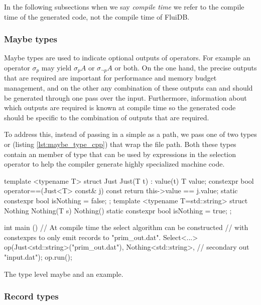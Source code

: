 In the following subsections when we say \emph{compile time} we refer to
the compile time of the generated code, not the compile time of FluiDB.

\subsubsection{Maybe types}

Maybe types are used to indicate optional outputs of operators. For
example an operator \(\sigma_p\) may yield \(\sigma_p A\) or
\(\sigma_{\neg p} A\) or both. On the one hand, the precise outputs that
are required are important for performance and memory budget
management, and on the other any combination of these outputs can and
should be generated through one pass over the input. Furthermore,
information about which outputs are required is known at compile time
so the generated code should be specific to the combination of outputs
that are required.

To address this, instead of passing in a simple  as a
path, we pass one of two types  or  (listing
\ref{lst:maybe_type_cpp}) that wrap the file path. Both these types
contain an  member of  type that can be used by
 expressions in the selection operator to help
the compiler generate highly specialized machine code.

\begin{code}
\begin{cppcode}
template <typename T>
struct Just {
  Just(T t) : value(t) {}
  T value;
  constexpr bool operator==(Just<T> const& j) const {
    return this->value == j.value;
  }
  static constexpr bool isNothing = false;
};
template <typename T=std::string>
struct Nothing {
  Nothing(T s) {}
  Nothing() {}
  static constexpr bool isNothing = true;
};

int main () {
  // At compile time the select algorithm can be constructed
  // with constexprs to only emit records to "prim_out.dat".
  Select<...> op(Just<std::string>("prim_out.dat"),
                 Nothing<std::string>, // secondary out
                "input.dat");
  op.run();
}
\end{cppcode}
\caption{\label{lst:maybe_type_cpp}The type level maybe and an example.}
\end{code}

\subsubsection{Record types}

